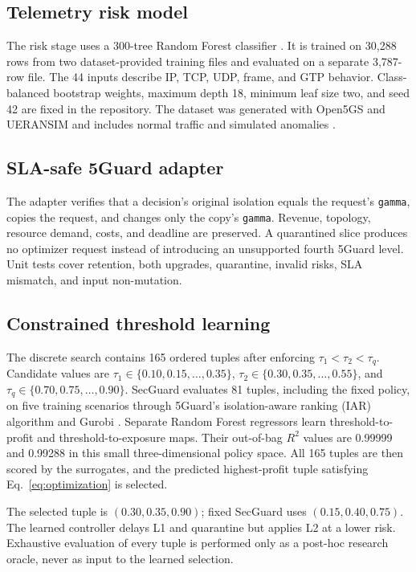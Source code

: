 \documentclass[conference]{IEEEtran}
\begin{document}
\subsection{Telemetry risk model}
The risk stage uses a 300-tree Random Forest classifier
\cite{breiman2001random}. It is trained on 30,288 rows from two
dataset-provided training files and evaluated on a separate 3,787-row file. The
44 inputs describe IP, TCP, UDP, frame, and GTP behavior. Class-balanced
bootstrap weights, maximum depth 18, minimum leaf size two, and seed 42 are
fixed in the repository. The dataset was generated with Open5GS and UERANSIM
and includes normal traffic and simulated anomalies \cite{sheikhi2023ddos,
open5gsdataset}.

\subsection{SLA-safe 5Guard adapter}
The adapter verifies that a decision's original isolation equals the request's
\texttt{gamma}, copies the request, and changes only the copy's \texttt{gamma}.
Revenue, topology, resource demand, costs, and deadline are preserved. A
quarantined slice produces no optimizer request instead of introducing an
unsupported fourth 5Guard level. Unit tests cover retention, both upgrades,
quarantine, invalid risks, SLA mismatch, and input non-mutation.

\subsection{Constrained threshold learning}
The discrete search contains 165 ordered tuples after enforcing
$\tau_1<\tau_2<\tau_q$. Candidate values are
$\tau_1\in\{0.10,0.15,\ldots,0.35\}$,
$\tau_2\in\{0.30,0.35,\ldots,0.55\}$, and
$\tau_q\in\{0.70,0.75,\ldots,0.90\}$. SecGuard evaluates 81 tuples,
including the fixed policy, on five training scenarios through 5Guard's
isolation-aware ranking (IAR) algorithm and Gurobi \cite{gurobi}. Separate
Random Forest regressors learn threshold-to-profit and threshold-to-exposure
maps. Their out-of-bag $R^2$ values are 0.99999 and 0.99288 in this small
three-dimensional policy space. All 165 tuples are then scored by the
surrogates, and the predicted highest-profit tuple satisfying
Eq.~\eqref{eq:optimization} is selected.

The selected tuple is $(0.30,0.35,0.90)$; fixed SecGuard uses
$(0.15,0.40,0.75)$. The learned controller delays L1 and quarantine but applies
L2 at a lower risk. Exhaustive evaluation of every tuple is performed only as a
post-hoc research oracle, never as input to the learned selection.
\end{document}
